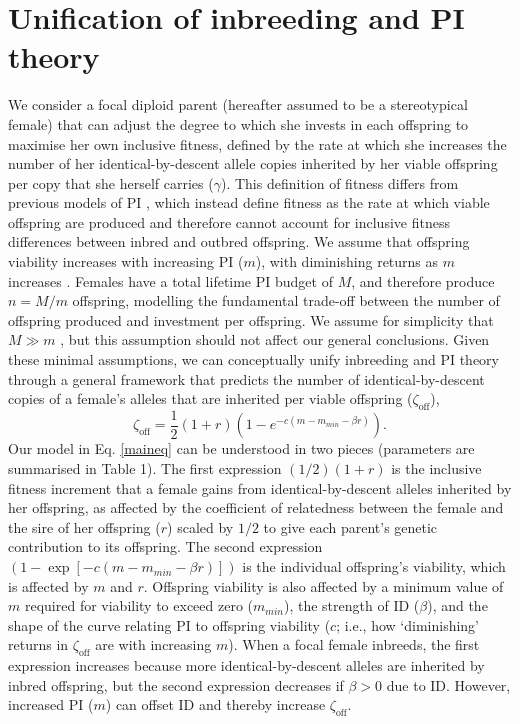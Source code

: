 \documentclass[10pt,letterpaper]{article}
\begin{document}
\section*{Unification of inbreeding and PI theory}

We consider a focal diploid parent (hereafter assumed to be a stereotypical female) that can adjust the degree to which she invests in each offspring to maximise her own inclusive fitness, defined by the rate at which she increases the number of her identical-by-descent allele copies inherited by her viable offspring per copy that she herself carries ($\gamma$). This definition of fitness differs from previous models of PI \cite[][]{Macnair1978, Parker1978}, which instead define fitness as the rate at which viable offspring are produced and therefore cannot account for inclusive fitness differences between inbred and outbred offspring. We assume that offspring viability increases with increasing PI ($m$), with diminishing returns as $m$ increases \cite[following][]{Parker1978}. Females have a total lifetime PI budget of $M$, and therefore produce $n=M/m$ offspring, modelling the fundamental trade-off between the number of offspring produced and investment per offspring. We assume for simplicity that $M \gg m$ \cite[following][]{Parker1985}, but this assumption should not affect our general conclusions. Given these minimal assumptions, we can conceptually unify inbreeding and PI theory through a general framework that predicts the number of identical-by-descent copies of a female's alleles that are inherited per viable offspring ($\zeta_{\textrm{off}}$),
\begin{equation} \label{maineq}
\zeta_{\textrm{off}} = \frac{1}{2}\left(1+r\right)\left(1-e^{-c\left(m-m_{min}-\beta r\right)}\right).
\end{equation}
Our model in Eq. \ref{maineq} can be understood in two pieces (parameters are summarised in Table 1). The first expression $\left(1/2\right) \left(1 + r\right)$ is the inclusive fitness increment that a female gains from identical-by-descent alleles inherited by her offspring, as affected by the coefficient of relatedness between the female and the sire of her offspring ($r$) scaled by $1/2$ to give each parent's genetic contribution to its offspring. The second expression $\left(1 - \exp\left[-c\left(m-m_{min}-\beta r\right)\right]\right)$ is the individual offspring's viability, which is affected by $m$ and $r$. Offspring viability is also affected by a minimum value of $m$ required for viability to exceed zero ($m_{min}$), the strength of ID ($\beta$), and the shape of the curve relating PI to offspring viability ($c$; i.e., how `diminishing' returns in $\zeta_{\textrm{off}}$ are with increasing $m$). When a focal female inbreeds, the first expression increases because more identical-by-descent alleles are inherited by inbred offspring, but the second expression decreases if $\beta>0$ due to ID. However, increased PI ($m$) can offset ID and thereby increase $\zeta_{\textrm{off}}$.
\end{document}
